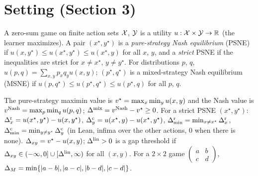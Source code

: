 \chapter{Setting (Section 3)}
\label{chap:setting}

\begin{definition}
  \label{def:game}
  \leanok
  A zero-sum game on finite action sets $\mathcal{X}$, $\mathcal{Y}$ is a utility $u : \mathcal{X} \times \mathcal{Y} \to \mathbb{R}$ (the
  learner maximizes). A pair $(x^\star, y^\star)$ is a \emph{pure-strategy Nash equilibrium}
  (PSNE) if $u(x, y^\star) \le u(x^\star, y^\star) \le u(x^\star, y)$ for all $x$, $y$, and a
  \emph{strict} PSNE if the inequalities are strict for $x \ne x^\star$, $y \ne y^\star$. For
  distributions $p$, $q$, $u(p, q) = \sum_{x, y} p_x q_y u(x, y)$; $(p^\star, q^\star)$ is a
  mixed-strategy Nash equilibrium (MSNE) if $u(p, q^\star) \le u(p^\star, q^\star) \le u(p^\star, q)$
  for all $p$, $q$.
\end{definition}

\begin{definition}
  \label{def:values}
  \leanok
  The pure-strategy maximin value is $v^\star = \max_x \min_y u(x, y)$ and the Nash value is
  $v^{\mathrm{Nash}} = \max_p \min_q u(p, q)$; $\Delta^{\mathrm{mix}} = v^{\mathrm{Nash}} - v^\star \ge 0$. For a strict PSNE
  $(x^\star, y^\star)$: $\Delta^{\mathrm{r}}_x = u(x^\star, y^\star) - u(x, y^\star)$,
  $\Delta^{\mathrm{c}}_y = u(x^\star, y) - u(x^\star, y^\star)$, $\Delta^{\mathrm{r}}_{\min} = \min_{x \ne x^\star} \Delta^{\mathrm{r}}_x$,
  $\Delta^{\mathrm{c}}_{\min} = \min_{y \ne y^\star} \Delta^{\mathrm{c}}_y$ (in Lean, infima over the other actions, $0$ when there is
  none). $\Delta_{xy} = v^\star - u(x, y)$; $\Delta^{\mathrm{lin}} > 0$ is a gap threshold if
  $\Delta_{xy} \in (-\infty, 0] \cup [\Delta^{\mathrm{lin}}, \infty)$ for all $(x, y)$. For a $2 \times 2$ game
  $\begin{pmatrix} a & b \\ c & d \end{pmatrix}$,
  $\Delta_{M} = \min\{\lvert a - b \rvert, \lvert a - c \rvert, \lvert b - d \rvert, \lvert c - d \rvert\}$.
\end{definition}

